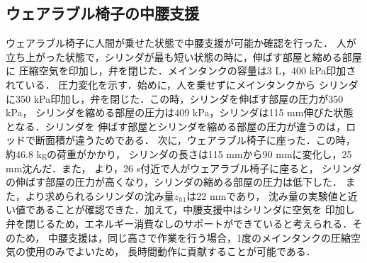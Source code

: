 \subsection{ウェアラブル椅子の中腰支援}
ウェアラブル椅子に人間が乗せた状態で中腰支援が可能か確認を行った．
人が立ち上がった状態で，シリンダが最も短い状態の時に，伸ばす部屋と縮める部屋に
圧縮空気を印加し，弁を閉じた．メインタンクの容量は3 L，400 kPa印加されている．
圧力変化を示す．始めに，人を乗せずにメインタンクから
シリンダに350 kPa印加し，弁を閉じた．この時，シリンダを伸ばす部屋の圧力が350 kPa，
シリンダを縮める部屋の圧力は409 kPa，シリンダは115 mm伸びた状態となる．シリンダを
伸ばす部屋とシリンダを縮める部屋の圧力が違うのは，ロッドで断面積が違うためである．
次に，ウェアラブル椅子に座った．この時，約46.8 kgの荷重がかかり，
シリンダの長さは115 mmから90 mmに変化し，25 mm沈んだ．また，
より，26 s付近で人がウェアラブル椅子に座ると，
シリンダの伸ばす部屋の圧力が高くなり，シリンダの縮める部屋の圧力は低下した．
また，より求められるシリンダの沈み量$z_{h1}$は22 mmであり，
沈み量の実験値と近い値であることが確認できた．加えて，中腰支援中はシリンダに空気を
印加し弁を閉じるため，エネルギー消費なしのサポートができていると考えられる．そのため，
中腰支援は，同じ高さで作業を行う場合，1度のメインタンクの圧縮空気の使用のみでよいため，
長時間動作に貢献することが可能である．
